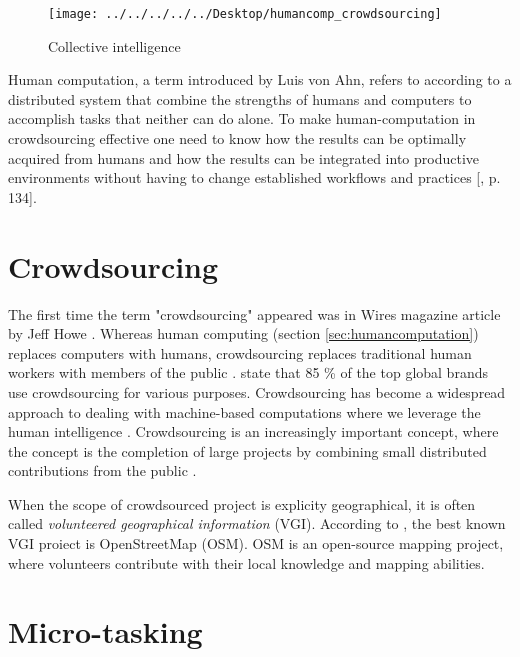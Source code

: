 \begin{figure}[H]
	\centering
	\texttt{[image: ../../../../../Desktop/humancomp\_crowdsourcing]}
	\caption{Collective intelligence \citep{Quinn2011}}
	\label{fig:humancompcrowdsourcing}
\end{figure}

Human computation, a term introduced by Luis von Ahn, refers to according to \cite{Quinn2011} a distributed system that combine the strengths of humans and computers to accomplish tasks that neither can do alone. To make human-computation in crowdsourcing effective one need to know how the results can be optimally acquired from humans and how the results can be integrated into productive environments without having to change established workflows and practices [\citep{Meier2013}, p. 134]. 

\section{Crowdsourcing}\label{sec:crowdsourcing}

The first time the term "crowdsourcing" appeared was in Wires magazine article by Jeff Howe \citep{Howe2006}. Whereas human computing (section \ref{sec:humancomputation}) replaces computers with humans, crowdsourcing replaces traditional human workers with members of the public \citep{Quinn2011}. \cite{EYeka2015} state that 85 \% of the top global brands use crowdsourcing for various purposes. Crowdsourcing has become a widespread approach to dealing with machine-based computations where we leverage the human intelligence \citep{Gadiraju2015}. Crowdsourcing is an increasingly important concept, where the concept is the completion of large projects by combining small distributed contributions from the public \citep{Salk2016}. 

When the scope of crowdsourced project is explicity geographical, it is often called \textit{volunteered geographical information} (VGI). According to \cite{Salk2016}, the best known VGI proiect is OpenStreetMap (OSM). OSM is an open-source mapping project, where volunteers contribute with their local knowledge and mapping abilities. 

\section{Micro-tasking}\label{sec:microtasking}

